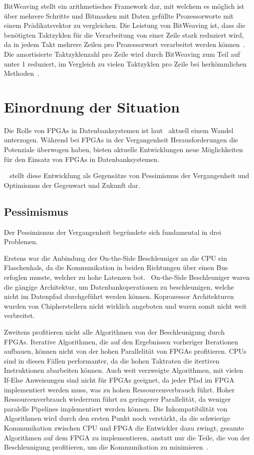 \documentclass[conference]{IEEEtran}
\begin{document}
BitWeaving stellt ein arithmetisches Framework dar, mit welchem es möglich ist über mehrere Schritte und Bitmasken mit Daten gefüllte Prozessorworte mit einem Prädikatsvektor zu vergleichen.
Die Leistung von BitWeaving ist, dass die benötigten Taktzyklen für die Verarbeitung von einer Zeile stark reduziert wird, da in jedem Takt mehrere Zeilen pro Prozessorwort verarbeitet werden können~\cite{li_bitweaving_2013}.
Die amortisierte Taktzyklenzahl pro Zeile wird durch BitWeaving zum Teil auf unter 1 reduziert, im Vergleich zu vielen Taktzyklen pro Zeile bei herkömmlichen Methoden~\cite{li_bitweaving_2013}.



\section{Einordnung der Situation} \label{sec:einordnung}
Die Rolle von FPGAs in Datenbanksystemen ist laut~\cite{istvan_glass_2019} aktuell einem Wandel unterzogen. Während bei FPGAs in der Vergangenheit
Herausforderungen die Potenziale überwogen haben, bieten aktuelle Entwicklungen neue Möglichkeiten für den Einsatz von FPGAs in Datenbanksystemen.

~\cite{istvan_glass_2019} stellt diese Entwicklung als Gegensätze von Pessimismus der Vergangenheit und Optimismus der Gegenwart und Zukunft dar.

\subsection{Pessimismus}
Der Pessimismus der Vergangenheit begründete sich fundamental in drei Problemen.

Erstens war die Anbindung der On-the-Side Beschleuniger an die CPU ein Flaschenhals, da die Kommunikation in beiden Richtungen über
einen Bus erfoglen musste, welcher zu hohe Latenzen bot.~\cite{istvan_glass_2019} On-the-Side Beschleuniger waren
die gängige Architektur, um Datenbankoperationen zu beschleunigen, welche nicht im Datenpfad durchgeführt werden können.
Koprozessor Architekturen wurden von Chipherstellern nicht wirklich angeboten und waren somit nicht weit verbreitet.

Zweitens profitieren nicht alle Algorithmen von der Beschleunigung durch FPGAs. Iterative Algorithmen, die auf den Ergebnissen vorheriger
Iterationen aufbauen, können nicht von der hohen Parallelität von FPGAs profitieren. CPUs sind in diesen Fällen performanter,
da die hohen Taktraten die itertiven Instruktionen abarbeiten können. Auch weit verzweigte Algorithmen, mit vielen If-Else Anweisungen
sind nicht für FPGAs geeignet, da jeder Pfad im FPGA implementiert werden muss, was zu hohen Ressourcenverbrauch führt. Hoher Ressourcenverbrauch
wiederrum führt zu geringerer Parallelität, da weniger paralelle Pipelines implementiert werden können. Die Inkompatibilität von Algorithmen
wird durch den ersten Punkt noch verstärkt, da die schwierige Kommunikation zwischen CPU und FPGA die Entwickler dazu zwingt, gesamte Algorithmen
auf dem FPGA zu implementieren, anstatt nur die Teile, die von der Beschleunigung profitieren, um die Kommunikation zu minimieren~\cite{istvan_glass_2019}.
\end{document}

